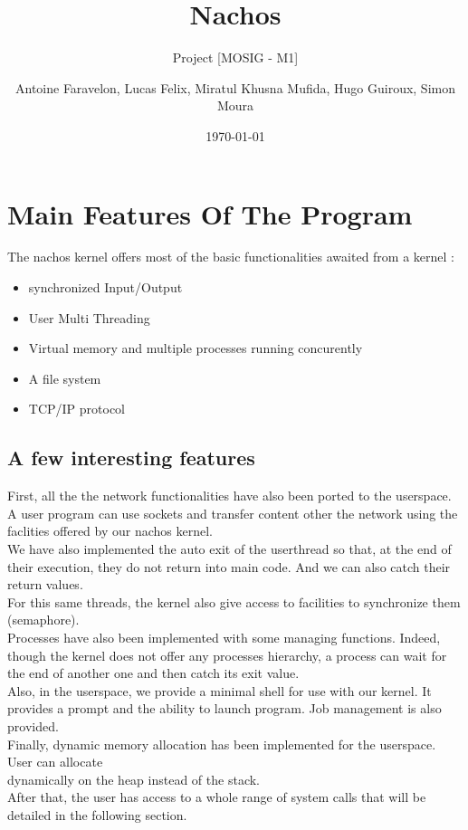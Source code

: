 \documentclass[a4paper,10pt]{article}
\title{Nachos}
\subtitle{Project [MOSIG - M1]}
\author{Antoine Faravelon, Lucas Felix, Miratul Khusna Mufida, Hugo Guiroux, Simon Moura}
\date{\today}
\begin{document}
\section{Main Features Of The Program}


The nachos kernel offers most of the basic functionalities awaited from a kernel :\\
\begin{itemize}
\item synchronized Input/Output
\item User Multi Threading
\item Virtual memory and multiple processes running concurently
\item A file system
\item TCP/IP protocol
\end{itemize}

\subsection{A few interesting features}

First, all the the network functionalities have also been ported to the userspace. A user program can use sockets and 
transfer content other the network using the faclities offered by our nachos kernel. \\
We have also implemented the auto exit of the userthread so that, at the end of their execution, they do not return
into main code. And we can also catch their return values.\\
For this same threads, the kernel also give access to facilities to synchronize them (semaphore).\\
Processes have also been implemented with some managing functions. Indeed, though the kernel does not offer any 
processes hierarchy, a process can wait for the end of another one and then catch its exit value.\\
Also, in the userspace, we provide a minimal shell for use with our kernel. It provides a prompt and the ability
to launch program. Job management is also provided.\\
Finally, dynamic memory allocation has been implemented for the userspace. User can allocate \\dynamically on the heap 
instead of the stack.\\
After that, the user has access to a whole range of system calls that will be detailed in the following section.
\end{document}
